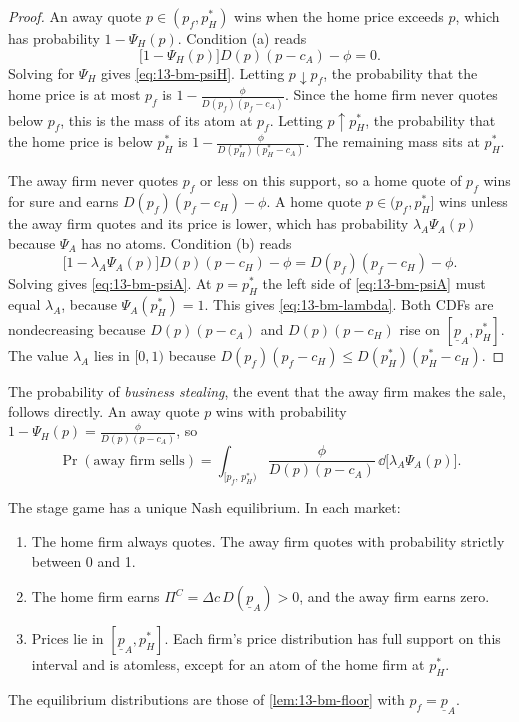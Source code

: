 \begin{proof}
An away quote $p\in(p_f,p_H^*)$ wins when the home price exceeds $p$, which has probability $1-\Psi_H(p)$.
Condition (a) reads
\[
\bigl[1-\Psi_H(p)\bigr]D(p)(p-c_A)-\phi=0 .
\]
Solving for $\Psi_H$ gives \eqref{eq:13-bm-psiH}. Letting $p\downarrow p_f$, the probability that the home
price is at most $p_f$ is $1-\frac{\phi}{D(p_f)(p_f-c_A)}$. Since the home firm never quotes below $p_f$, this
is the mass of its atom at $p_f$. Letting $p\uparrow p_H^*$, the probability that the home price is below
$p_H^*$ is $1-\frac{\phi}{D(p_H^*)(p_H^*-c_A)}$. The remaining mass sits at $p_H^*$.

The away firm never quotes $p_f$ or less on this support, so a home quote of $p_f$ wins for sure and earns
$D(p_f)(p_f-c_H)-\phi$. A home quote $p\in(p_f,p_H^*]$ wins unless the away firm quotes and its price is lower,
which has probability $\lambda_A\Psi_A(p)$ because $\Psi_A$ has no atoms. Condition (b) reads
\[
\bigl[1-\lambda_A\Psi_A(p)\bigr]D(p)(p-c_H)-\phi=D(p_f)(p_f-c_H)-\phi .
\]
Solving gives \eqref{eq:13-bm-psiA}. At $p=p_H^*$ the left side of \eqref{eq:13-bm-psiA} must equal
$\lambda_A$, because $\Psi_A(p_H^*)=1$. This gives \eqref{eq:13-bm-lambda}. Both CDFs are nondecreasing
because $D(p)(p-c_A)$ and $D(p)(p-c_H)$ rise on $[\underline p_A,p_H^*]$. The value $\lambda_A$ lies in
$[0,1)$ because $D(p_f)(p_f-c_H)\le D(p_H^*)(p_H^*-c_H)$.
\end{proof}

The probability of \emph{business stealing}, the event that the away firm makes the sale, follows directly.
An away quote $p$ wins with probability $1-\Psi_H(p)=\frac{\phi}{D(p)(p-c_A)}$, so
\begin{equation}\label{eq:13-bm-steal}
\Pr(\text{away firm sells})=\int_{[p_f,\,p_H^*)}\frac{\phi}{D(p)(p-c_A)}\,\dd\bigl[\lambda_A\Psi_A(p)\bigr] .
\end{equation}

\begin{theorem}\label{thm:13-bm-static}
The stage game has a unique Nash equilibrium. In each market:
\begin{enumerate}[label=(\roman*)]
\item The home firm always quotes. The away firm quotes with probability strictly between 0 and 1.
\item The home firm earns $\Pi^C=\Delta c\,D(\underline p_A)>0$, and the away firm earns zero.
\item Prices lie in $[\underline p_A,p_H^*]$. Each firm's price distribution has full support on this interval
and is atomless, except for an atom of the home firm at $p_H^*$.
\end{enumerate}
The equilibrium distributions are those of \cref{lem:13-bm-floor} with $p_f=\underline p_A$.
\end{theorem}

